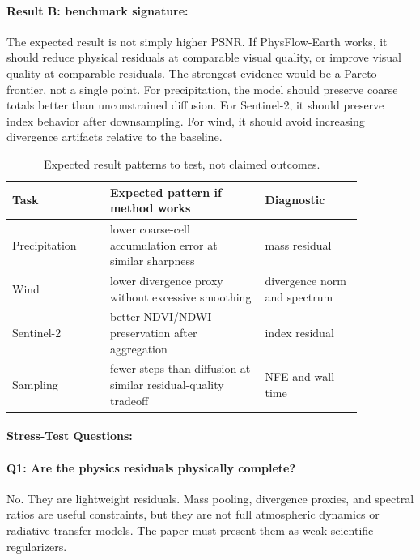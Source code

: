 \documentclass{article}
\begin{document}
\paragraph{Result B: benchmark signature:}

The expected result is not simply higher PSNR. If PhysFlow-Earth works, it should reduce physical residuals at comparable visual quality, or improve visual quality at comparable residuals. The strongest evidence would be a Pareto frontier, not a single point. For precipitation, the model should preserve coarse totals better than unconstrained diffusion. For Sentinel-2, it should preserve index behavior after downsampling. For wind, it should avoid increasing divergence artifacts relative to the baseline.

\begin{table}[t]
\centering
\caption{Expected result patterns to test, not claimed outcomes.}
\begin{tabular}{@{}p{0.24\linewidth}p{0.38\linewidth}p{0.24\linewidth}@{}}
\toprule
\textbf{Task} & \textbf{Expected pattern if method works} & \textbf{Diagnostic}\\
\midrule
Precipitation & lower coarse-cell accumulation error at similar sharpness & mass residual\\
Wind & lower divergence proxy without excessive smoothing & divergence norm and spectrum\\
Sentinel-2 & better NDVI/NDWI preservation after aggregation & index residual\\
Sampling & fewer steps than diffusion at similar residual-quality tradeoff & NFE and wall time\\
\bottomrule
\end{tabular}
\end{table}

\paragraph{Stress-Test Questions:}

\paragraph{Q1: Are the physics residuals physically complete?}
No. They are lightweight residuals. Mass pooling, divergence proxies, and spectral ratios are useful constraints, but they are not full atmospheric dynamics or radiative-transfer models. The paper must present them as weak scientific regularizers.
\end{document}
